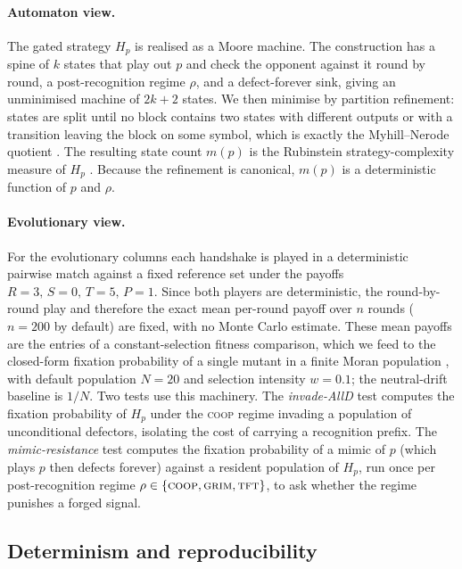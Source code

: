 \paragraph{Automaton view.}
The gated strategy $H_p$ is realised as a Moore machine. The construction has a spine of
$k$ states that play out $p$ and check the opponent against it round by round, a
post-recognition regime $\rho$, and a defect-forever sink, giving an unminimised machine
of $2k+2$ states. We then minimise by partition refinement: states are split until no
block contains two states with different outputs or with a transition leaving the block
on some symbol, which is exactly the Myhill--Nerode quotient
\citep{nerode1958,hopcroft1971}. The resulting state count $m(p)$ is the
Rubinstein strategy-complexity measure of $H_p$ \citep{rubinstein1986}. Because the
refinement is canonical, $m(p)$ is a deterministic function of $p$ and $\rho$.

\paragraph{Evolutionary view.}
For the evolutionary columns each handshake is played in a deterministic pairwise match
against a fixed reference set under the payoffs $R=3,\,S=0,\,T=5,\,P=1$. Since both
players are deterministic, the round-by-round play and therefore the exact mean
per-round payoff over $n$ rounds ($n=200$ by default) are fixed, with no Monte Carlo
estimate. These mean payoffs are the entries of a constant-selection fitness comparison,
which we feed to the closed-form fixation probability of a single mutant in a
finite Moran population \citep{moran1958,nowak2004}, with default population $N=20$ and
selection intensity $w=0.1$; the neutral-drift baseline is $1/N$. Two tests use this
machinery. The \emph{invade-AllD} test computes the fixation probability of $H_p$ under
the \textsc{coop} regime invading a population of unconditional defectors, isolating the
cost of carrying a recognition prefix. The \emph{mimic-resistance} test computes the
fixation probability of a mimic of $p$ (which plays $p$ then defects forever) against a
resident population of $H_p$, run once per post-recognition regime
$\rho\in\{\textsc{coop},\textsc{grim},\textsc{tft}\}$, to ask whether the regime punishes
a forged signal.

\subsection{Determinism and reproducibility}

